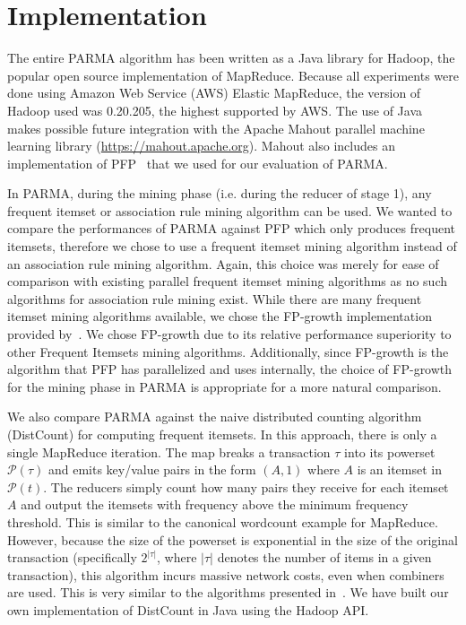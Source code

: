 \section{Implementation} 
\label{sec:parmadesign} 
The entire PARMA algorithm has been written as a Java library for
Hadoop, the popular open source implementation of MapReduce. Because all
experiments were done using Amazon Web Service (AWS) Elastic MapReduce,
the version of Hadoop used was 0.20.205, the highest supported by AWS.
The use of Java makes possible future integration with the Apache Mahout
parallel machine learning library (\url{https://mahout.apache.org}). Mahout also
includes an implementation of PFP~\citep{LiWZZC08} that we used for our
evaluation of PARMA.

In PARMA, during the mining phase (i.e. during the reducer of stage 1),
any frequent itemset or association rule mining algorithm can be used.
We wanted to compare the performances of PARMA against PFP which only
produces frequent itemsets, therefore we chose to use a frequent itemset
mining algorithm instead of an association rule mining algorithm. Again,
this choice was merely for ease of comparison with existing parallel
frequent itemset mining algorithms as no such algorithms for association
rule mining exist. While there are many frequent itemset mining
algorithms available, we chose the FP-growth implementation provided
by~\citep{Fp}. We chose FP-growth due to its relative performance
superiority to other Frequent Itemsets mining algorithms. Additionally,
since FP-growth is the algorithm that PFP has parallelized and uses
internally, the choice of FP-growth for the mining phase in PARMA is
appropriate for a more natural comparison.

We also compare PARMA against the naive distributed counting algorithm
(DistCount) for computing frequent itemsets. In this approach, there is
only a single MapReduce iteration. The map breaks a transaction $\tau$
into its powerset $\mathcal{P}(\tau)$ and emits key/value pairs in the
form $(A, 1)$ where $A$ is an itemset in $\mathcal{P}(t)$. The reducers
simply count how many pairs they receive for each itemset $A$ and output
the itemsets with frequency above the minimum frequency threshold. This
is similar to the canonical wordcount example for MapReduce. However,
because the size of the powerset is exponential in the size of the
original transaction (specifically $2^{|\tau|}$, where $|\tau|$ denotes
the number of items in a given transaction), this algorithm incurs
massive network costs, even when combiners are used. This is very similar to the
algorithms presented in~\citep{CryansRC10,LiZ11,YangLF10}. We have built our own
implementation of DistCount in Java using the Hadoop API.
